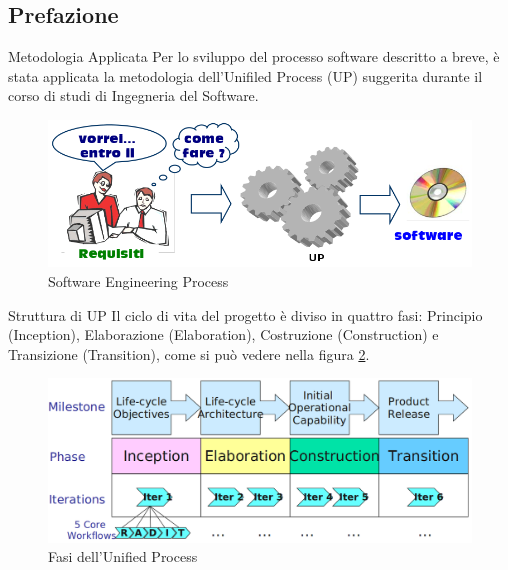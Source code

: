 \subsection{Prefazione}
 \begin{frame} {Metodologia Applicata}
  Per lo sviluppo del processo software descritto a breve, è stata applicata la metodologia dell'Unifiled Process (UP) suggerita
  durante il corso di studi di Ingegneria del Software.
   \begin{figure}
     \includegraphics[scale=0.40]{image/Up_sep.png}{\centering}
    \caption{Software Engineering Process} 
    \label{fig_SEP}
   \end{figure}
 \end{frame}

 \begin{frame} {Struttura di UP}
    Il ciclo di vita del progetto è diviso in quattro fasi: Principio (Inception), Elaborazione (Elaboration), Costruzione (Construction)
    e Transizione (Transition), come si può vedere nella figura \ref{fig_US}. 
   \begin{figure}
     \includegraphics[scale=0.26]{image/Up_Structure.png}{\centering}
    \caption{Fasi dell'Unified Process} 
    \label{fig_US}
   \end{figure}
  \end{frame}

